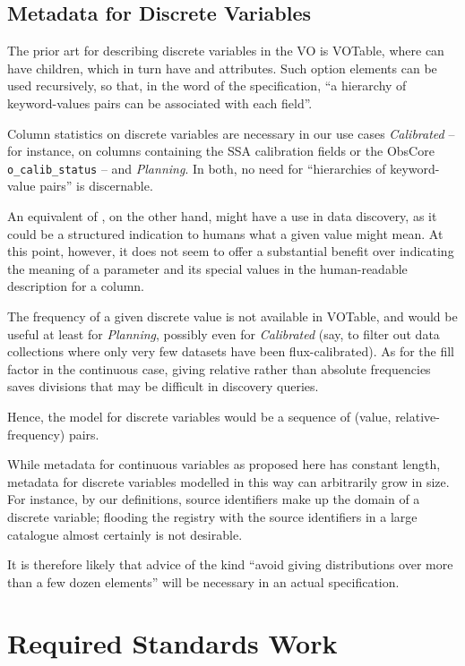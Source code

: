 \documentclass[11pt,a4paper]{ivoa}
\begin{document}
\subsection{Metadata for Discrete Variables}

The prior art for describing discrete variables in the VO is VOTable,
where  can have  children, which in turn
have  and  attributes.  Such option elements
can be used recursively, so that, in the word of the specification, 
``a hierarchy of keyword-values pairs can be associated with each
field''.

Column statistics on discrete variables are necessary in our use cases
\emph{Calibrated} -- for instance, on columns containing the SSA
calibration fields or the ObsCore \verb|o_calib_status| -- and
\emph{Planning}.  In both, no need for ``hierarchies of keyword-value
pairs'' is discernable.

An equivalent of , on the other hand, might have a use in
data discovery, as it could be a structured indication to humans what a
given value might mean.  At this point, however, it does not seem to
offer a substantial benefit over indicating the meaning of a parameter
and its special values in the human-readable description for a column.

The frequency of a given discrete value is not available in VOTable,
and would be useful at least for \emph{Planning}, 
possibly even for \emph{Calibrated}
(say, to filter out data collections where only very few datasets have been
flux-calibrated).  As for the fill factor in the continuous case,
giving relative rather than absolute frequencies saves divisions that may
be difficult in discovery queries.

Hence, the model for discrete variables would be a sequence of (value,
relative-frequency) pairs.

While metadata for continuous variables as proposed here has
constant length, metadata for discrete variables modelled in this way
can arbitrarily grow in
size.  For instance, by our definitions, source identifiers make up the
domain of a discrete variable; flooding the registry with the source
identifiers in a large catalogue almost certainly is not desirable.

It is therefore likely that advice of the kind ``avoid giving
distributions over more than a few dozen elements'' will be necessary in
an actual specification.


\section{Required Standards Work}
\end{document}
